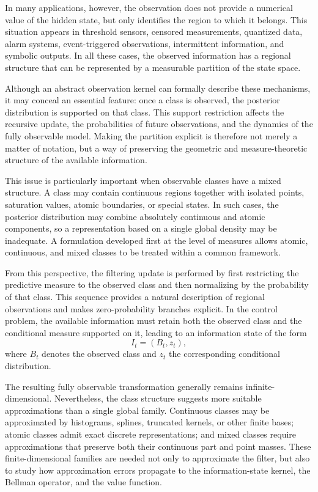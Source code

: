 \documentclass[10pt,twocolumn]{article}
\theoremstyle{remark}
\begin{document}
In many applications, however, the observation does not provide a numerical value of the hidden state, but only identifies the region to which it belongs. This situation appears in threshold sensors, censored measurements, quantized data, alarm systems, event-triggered observations, intermittent information, and symbolic outputs. In all these cases, the observed information has a regional structure that can be represented by a measurable partition of the state space.

Although an abstract observation kernel can formally describe these mechanisms, it may conceal an essential feature: once a class is observed, the posterior distribution is supported on that class. This support restriction affects the recursive update, the probabilities of future observations, and the dynamics of the fully observable model. Making the partition explicit is therefore not merely a matter of notation, but a way of preserving the geometric and measure-theoretic structure of the available information.

This issue is particularly important when observable classes have a mixed structure. A class may contain continuous regions together with isolated points, saturation values, atomic boundaries, or special states. In such cases, the posterior distribution may combine absolutely continuous and atomic components, so a representation based on a single global density may be inadequate. A formulation developed first at the level of measures allows atomic, continuous, and mixed classes to be treated within a common framework.

From this perspective, the filtering update is performed by first restricting the predictive measure to the observed class and then normalizing by the probability of that class. This sequence provides a natural description of regional observations and makes zero-probability branches explicit. In the control problem, the available information must retain both the observed class and the conditional measure supported on it, leading to an information state of the form
\[
I_t=(B_t,z_t),
\]
where \(B_t\) denotes the observed class and \(z_t\) the corresponding conditional distribution.

The resulting fully observable transformation generally remains infinite-dimensional. Nevertheless, the class structure suggests more suitable approximations than a single global family. Continuous classes may be approximated by histograms, splines, truncated kernels, or other finite bases; atomic classes admit exact discrete representations; and mixed classes require approximations that preserve both their continuous part and point masses. These finite-dimensional families are needed not only to approximate the filter, but also to study how approximation errors propagate to the information-state kernel, the Bellman operator, and the value function.
\end{document}
